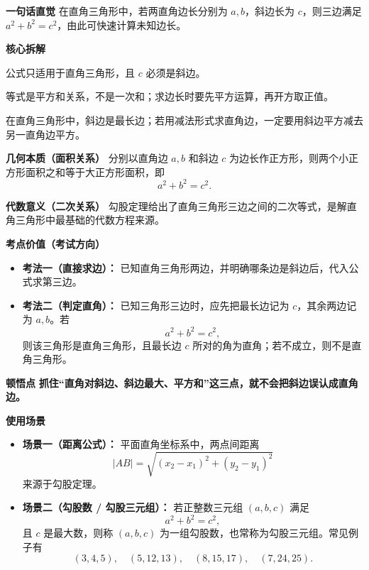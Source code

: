 \begin{explanationbox}
	\textbf{\textcolor{CExplanation}{一句话直觉}}
	在直角三角形中，若两直角边长分别为 $a,b$，斜边长为 $c$，则三边满足 $a^{2}+b^{2}=c^{2}$，由此可快速计算未知边长。
	\medskip

	\textbf{\textcolor{CExplanation}{核心拆解}}
	\begin{description}[style=nextline, leftmargin=2.8em, labelsep=0.5em, itemsep=0.45em]
		\item[\textbf{要点一（直角三角形）：}] 公式只适用于直角三角形，且 $c$ 必须是斜边。
		\item[\textbf{要点二（平方运算）：}] 等式是平方和关系，不是一次和；求边长时要先平方运算，再开方取正值。
		\item[\textbf{要点三（斜边最大）：}] 在直角三角形中，斜边是最长边；若用减法形式求直角边，一定要用斜边平方减去另一直角边平方。
	\end{description}
	\medskip

	\textbf{\textcolor{CExplanation}{几何本质（面积关系）}}
	分别以直角边 $a,b$ 和斜边 $c$ 为边长作正方形，则两个小正方形面积之和等于大正方形面积，即
	\[
		a^2+b^2=c^2.
	\]
	\medskip

	\textbf{\textcolor{CExplanation}{代数意义（二次关系）}}
	勾股定理给出了直角三角形三边之间的二次等式，是解直角三角形中最基础的代数方程来源。
	\medskip

	\textbf{\textcolor{CExplanation}{考点价值（考试方向）}}
	\begin{itemize}[leftmargin=*, itemsep=0.5em, topsep=0.4em]
		\item \textbf{考法一（直接求边）：} 已知直角三角形两边，并明确哪条边是斜边后，代入公式求第三边。
		\item \textbf{考法二（判定直角）：} 已知三角形三边时，应先把最长边记为 $c$，其余两边记为 $a,b$。若
		      \[
			      a^{2}+b^{2}=c^{2},
		      \]
		      则该三角形是直角三角形，且最长边 $c$ 所对的角为直角；若不成立，则不是直角三角形。
	\end{itemize}
	\medskip

	\textbf{\textcolor{CExplanation}{顿悟点}}
	\textbf{抓住“直角对斜边、斜边最大、平方和”这三点，就不会把斜边误认成直角边。}
	\medskip

	\textbf{\textcolor{CExplanation}{使用场景}}
	\begin{itemize}[leftmargin=*, itemsep=0.5em, topsep=0.4em]
		\item \textbf{场景一（距离公式）：} 平面直角坐标系中，两点间距离
		      \[
			      |AB|=\sqrt{(x_2-x_1)^2+(y_2-y_1)^2}
		      \]
		      来源于勾股定理。
		\item \textbf{场景二（勾股数 / 勾股三元组）：} 若正整数三元组 $(a,b,c)$ 满足
		      \[
			      a^{2}+b^{2}=c^{2},
		      \]
		      且 $c$ 是最大数，则称 $(a,b,c)$ 为一组勾股数，也常称为勾股三元组。常见例子有
		      \[
			      (3,4,5),\quad (5,12,13),\quad (8,15,17),\quad (7,24,25).
		      \]
	\end{itemize}
\end{explanationbox}